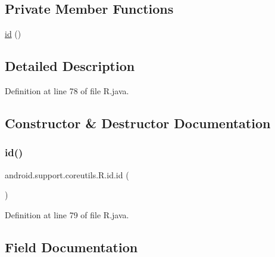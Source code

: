 \subsection*{Private Member Functions}
\begin{DoxyCompactItemize}
\item 
\mbox{\hyperlink{classandroid_1_1support_1_1coreutils_1_1_r_1_1id_a2be50e004939b8a3fbae0585d6969e0b}{id}} ()
\end{DoxyCompactItemize}


\subsection{Detailed Description}


Definition at line 78 of file R.\+java.



\subsection{Constructor \& Destructor Documentation}
\mbox{\label{classandroid_1_1support_1_1coreutils_1_1_r_1_1id_a2be50e004939b8a3fbae0585d6969e0b}} 
\subsubsection{\texorpdfstring{id()}{id()}}
{\footnotesize\ttfamily android.\+support.\+coreutils.\+R.\+id.\+id (\begin{DoxyParamCaption}{ }\end{DoxyParamCaption})\hspace{0.3cm}{\ttfamily [private]}}



Definition at line 79 of file R.\+java.


\begin{DoxyCode}{0}

\end{DoxyCode}


\subsection{Field Documentation}
\mbox{\label{classandroid_1_1support_1_1coreutils_1_1_r_1_1id_acef2a9e85463b5b560ea32ce9cd47e6b}} 
